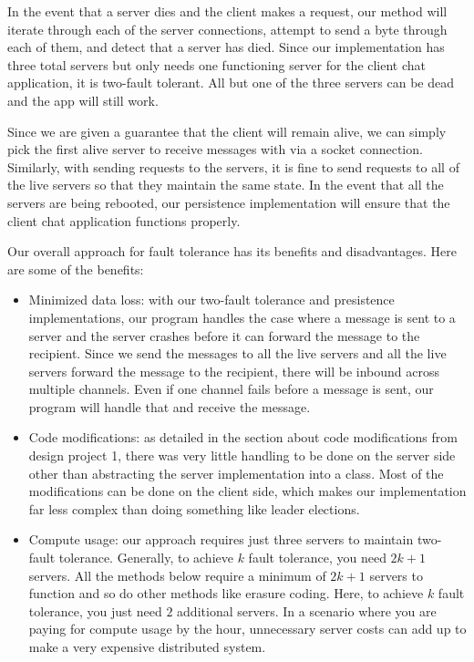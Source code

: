 \documentclass[
	a4paper, %
	10pt, %
	unnumberedsections, %
	twoside, %
]{LTJournalArticle}
\begin{document}
In the event that a server dies and the client makes a request, our method will iterate through each of the server connections, attempt to send a byte through each of them, and detect that a server has died. Since our implementation has three total servers but only needs one functioning server for the client chat application, it is two-fault tolerant. All but one of the three servers can be dead and the app will still work.

Since we are given a guarantee that the client will remain alive, we can simply pick the first alive server to receive messages with via a socket connection. Similarly, with sending requests to the servers, it is fine to send requests to all of the live servers so that they maintain the same state. In the event that all the servers are being rebooted, our persistence implementation will ensure that the client chat application functions properly. 

Our overall approach for fault tolerance has its benefits and disadvantages. Here are some of the benefits: 
\begin{itemize}
    \item Minimized data loss: with our two-fault tolerance and presistence implementations, our program handles the case where a message is sent to a server and the server crashes before it can forward the message to the recipient. Since we send the messages to all the live servers and all the live servers forward the message to the recipient, there will be inbound across multiple channels. Even if one channel fails before a message is sent, our program will handle that and receive the message.
    \item Code modifications: as detailed in the section about code modifications from design project 1, there was very little handling to be done on the server side other than abstracting the server implementation into a class. Most of the modifications can be done on the client side, which makes our implementation far less complex than doing something like leader elections. 
    \item Compute usage: our approach requires just three servers to maintain two-fault tolerance. Generally, to achieve $k$ fault tolerance, you need $2k + 1$ servers. All the methods below require a minimum of $2k + 1$ servers to function and so do other methods like erasure coding. Here, to achieve $k$ fault tolerance, you just need $2$ additional servers. In a scenario where you are paying for compute usage by the hour, unnecessary server costs can add up to make a very expensive distributed system. 
\end{itemize}
\end{document}
